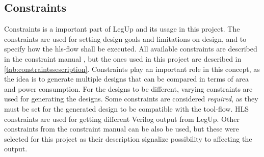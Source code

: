 \subsection{Constraints}
Constraints is a important part of LegUp and its usage in this project. The constraints are used for setting design goals and limitations on design, and to specify how the \gls{hls}-flow shall be executed. All available constraints are described in the constraint manual \cite{legupconst}, but the ones used in this project are described in \cref{tab:constraintssescription}. Constraints play an important role in this concept, as the idea is to generate multiple designs that can be compared in terms of area and power consumption. For the designs to be different, varying constraints are used for generating the designs. Some constraints are considered \textit{required}, as they must be set for the generated design to be compatible with the tool-flow. HLS constraints are used for getting different Verilog output from LegUp. Other constraints from the constraint manual can be also be used, but these were selected for this project as their description signalize possibility to affecting the output.
